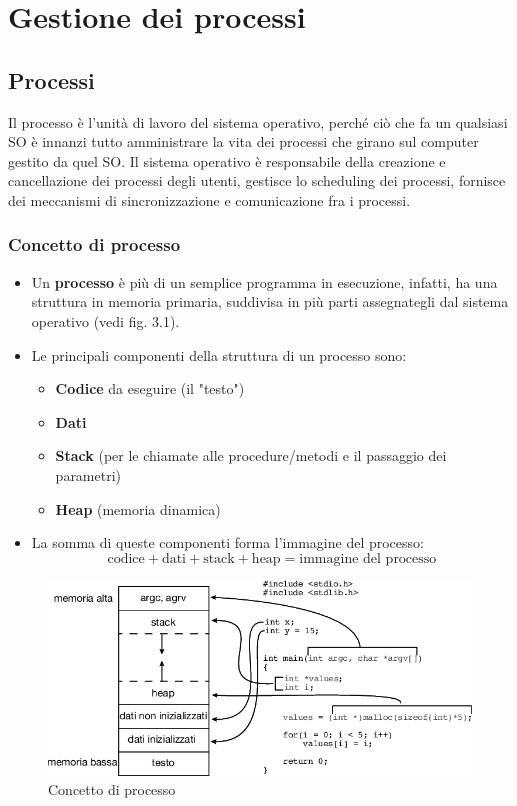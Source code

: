 \chapter{Gestione dei processi}

\section{Processi}
Il processo è l'unità di lavoro del sistema operativo, perché ciò che fa un qualsiasi SO è innanzi tutto amministrare la vita dei processi che girano sul computer gestito da quel SO.
Il sistema operativo è responsabile della creazione e cancellazione dei processi degli utenti, gestisce lo scheduling dei processi, fornisce dei meccanismi di sincronizzazione e comunicazione fra i processi.\\

\subsection{Concetto di processo}
\begin{itemize}
    \item Un \textbf{processo} è più di un semplice programma in esecuzione, infatti, ha una struttura in memoria primaria, suddivisa in più parti assegnategli dal sistema operativo (vedi fig. 3.1).
    \item Le principali componenti della struttura di un processo sono:
    \begin{itemize}
        \item \textbf{Codice} da eseguire (il "testo")
        \item \textbf{Dati}
        \item \textbf{Stack} (per le chiamate alle procedure/metodi e il passaggio dei parametri)
        \item \textbf{Heap} (memoria dinamica)
    \end{itemize}
    \item La somma di queste componenti forma l'immagine del processo:
    \[
    \text{codice} + \text{dati} + \text{stack} + \text{heap} = \text{immagine del processo}
    \]
\end{itemize}

\begin{figure}[h]
    \centering
    \includegraphics[width=0.5\linewidth]{images/Concetto-di-processo.png}
    \caption{Concetto di processo}
    \label{fig:prco1}
\end{figure}


